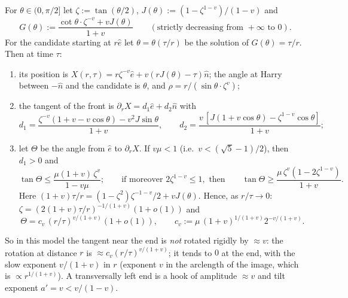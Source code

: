 \begin{proposition}\label{prop:E-trans}
For $\theta\in(0,\pi/2]$ let $\zeta:=\tan(\theta/2)$, $J(\theta):=(1-\zeta^{1-v})/(1-v)$ and
\[
G(\theta):=\frac{\cot\theta\cdot\zeta^{-v}+vJ(\theta)}{1+v}\qquad(\text{strictly decreasing from }+\infty\text{ to }0).
\]
For the candidate starting at $r\hat e$ let $\theta=\theta(\tau/r)$ be the solution of $G(\theta)=\tau/r$. Then at time $\tau$:
\begin{enumerate}
\item[(i)] its position is $X(r,\tau)=r\zeta^{-v}\hat e+v(rJ(\theta)-\tau)\hat n$; the angle at Harry between $-\hat n$ and the
candidate is $\theta$, and $\rho=r/(\sin\theta\cdot\zeta^v)$;
\item[(ii)] the tangent of the front is $\partial_rX=d_1\hat e+d_2\hat n$ with
\[
d_1=\frac{\zeta^{-v}(1+v-v\cos\theta)-v^2J\sin\theta}{1+v},\qquad d_2=\frac{v\,[J(1+v\cos\theta)-\zeta^{1-v}\cos\theta]}{1+v};
\]
\item[(iii)] let $\Theta$ be the angle from $\hat e$ to $\partial_rX$. If $v\mu<1$ (i.e.\ $v<(\sqrt5-1)/2$), then $d_1>0$ and
\[
\tan\Theta\le\frac{\mu(1+v)\,\zeta^v}{1-v\mu};\qquad\text{if moreover }2\zeta^{1-v}\le1,\text{ then}\qquad
\tan\Theta\ge\frac{\mu\,\zeta^v(1-2\zeta^{1-v})}{1+v}.
\]
Here $(1+v)\tau/r=(1-\zeta^2)\zeta^{-1-v}/2+vJ(\theta)$. Hence, as $r/\tau\to0$:
$\zeta=(2(1+v)\tau/r)^{-1/(1+v)}(1+o(1))$ and
\[
\Theta=c_v\,(r/\tau)^{v/(1+v)}(1+o(1)),\qquad c_v:=\mu\,(1+v)^{1/(1+v)}2^{-v/(1+v)} .
\]
\end{enumerate}
\end{proposition}
So in this model the tangent near the end is \emph{not} rotated rigidly by $\approx v$: the rotation at distance $r$ is
$\approx c_v(r/\tau)^{v/(1+v)}$; it tends to $0$ at the end, with the slow exponent $v/(1+v)$ in $r$ (exponent $v$ in the arclength
of the image, which is $\propto r^{1/(1+v)}$). A transversally left end is a hook of amplitude $\approx v$ and tilt exponent
$a'=v<v/(1-v)$.
